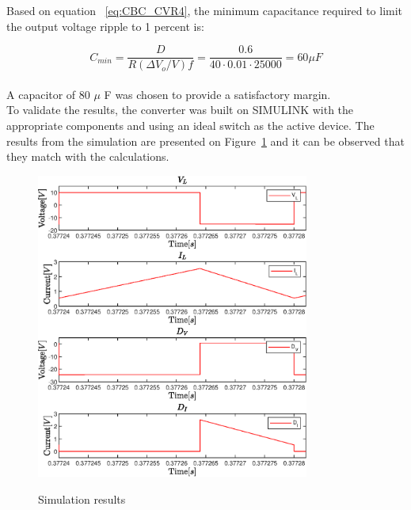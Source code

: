 Based on equation ~\ref{eq:CBC_CVR4}, the minimum capacitance required to limit the output voltage ripple to 1 percent is:

\begin{equation}
C_{min} = \frac{D}{R(\Delta V_o/V)f} = \frac{0.6}{40\cdot 0.01\cdot 25000 } = 60\mu F
\end{equation}\\
A capacitor of 80 $\mu$ F was chosen to provide a satisfactory margin.\\
To validate the results, the converter was built on SIMULINK with the appropriate components and using an ideal switch as the active device. The results from the simulation are presented on Figure~\ref{fig:CBC_SimResults} and it can be observed that they match with the calculations. 


\begin{figure}[H]%
    \centering
    {{\includegraphics[width=0.8\textwidth]{figures/aConventionalBoost/CBC_V_LtoI_D.eps} }}%
    \qquad
    \caption{Simulation results}%
     \label{fig:CBC_SimResults}%
\end{figure}